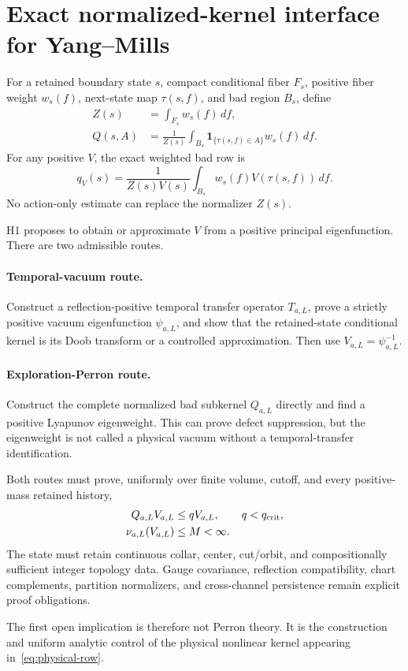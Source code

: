 \section{Exact normalized-kernel interface for Yang--Mills}

For a retained boundary state \(s\), compact conditional fiber \(F_s\),
positive fiber weight \(w_s(f)\), next-state map \(\tau(s,f)\), and bad region
\(B_s\), define
\begin{align}
 Z(s)&=\int_{F_s}w_s(f)\,df,\\
 Q(s,A)&=\frac1{Z(s)}
 \int_{B_s}\mathbf 1_{\{\tau(s,f)\in A\}}w_s(f)\,df.
\end{align}
For any positive \(V\), the exact weighted bad row is
\begin{equation}\label{eq:physical-row}
 q_V(s)=\frac{1}{Z(s)V(s)}
 \int_{B_s}w_s(f)V(\tau(s,f))\,df.
\end{equation}
No action-only estimate can replace the normalizer \(Z(s)\).

H1 proposes to obtain or approximate \(V\) from a positive principal
eigenfunction.  There are two admissible routes.

\paragraph{Temporal-vacuum route.}
Construct a reflection-positive temporal transfer operator
\(T_{a,L}\), prove a strictly positive vacuum eigenfunction \(\psi_{a,L}\),
and show that the retained-state conditional kernel is its Doob transform or
a controlled approximation.  Then use \(V_{a,L}=\psi_{a,L}^{-1}\).

\paragraph{Exploration-Perron route.}
Construct the complete normalized bad subkernel \(Q_{a,L}\) directly and find
a positive Lyapunov eigenweight.  This can prove defect suppression, but the
eigenweight is not called a physical vacuum without a temporal-transfer
identification.

Both routes must prove, uniformly over finite volume, cutoff, and every
positive-mass retained history,
\begin{align}
 Q_{a,L}V_{a,L}&\le qV_{a,L},\qquad q<q_{\mathrm{crit}},\\
 \nu_{a,L}(V_{a,L})&\le M<\infty.
\end{align}
The state must retain continuous collar, center, cut/orbit, and
compositionally sufficient integer topology data.  Gauge covariance,
reflection compatibility, chart complements, partition normalizers, and
cross-channel persistence remain explicit proof obligations.

The first open implication is therefore not Perron theory.  It is the
construction and uniform analytic control of the physical nonlinear kernel
appearing in~\eqref{eq:physical-row}.
